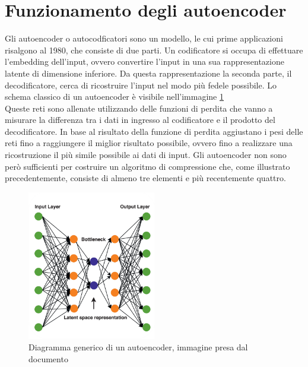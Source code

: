\section{Funzionamento degli autoencoder}
Gli autoencoder o autocodficatori sono un modello, le cui prime applicazioni risalgono al 1980, che consiste di due parti. Un codificatore si occupa di effettuare l’embedding dell’input, ovvero convertire l’input in una sua rappresentazione latente di dimensione inferiore. Da questa rappresentazione la seconda parte, il decodificatore, cerca di ricostruire l’input nel modo più fedele possibile. Lo schema classico di un autoencoder è visibile nell’immagine \ref{fig:modelloAutoencoder}\\
Queste reti sono allenate utilizzando delle funzioni di perdita che vanno a misurare la differenza tra i dati in ingresso al codificatore e il prodotto del decodificatore. In base al risultato della funzione di perdita aggiustano i pesi delle reti fino a raggiungere il miglior risultato possibile, ovvero fino a realizzare una ricostruzione il più simile possibile ai dati di input.
Gli autoencoder non sono però sufficienti per costruire un algoritmo di compressione che, come illustrato precedentemente, consiste di almeno tre elementi e più recentemente quattro.
\newpage
\begin{figure}[!h]
    \centering
    \includegraphics[width=0.5\textwidth]{Immagini/Autoencoder_scheme.png}
    \caption{Diagramma generico di un autoencoder, immagine presa dal documento \cite{mishra2022deep}}
    \label{fig:modelloAutoencoder}
\end{figure}
